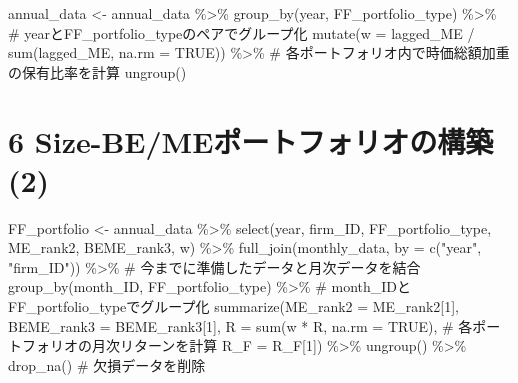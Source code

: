 \documentclass[
  letterpaper,
  DIV=11,
  numbers=noendperiod]{scrreprt}
\newenvironment{Shaded}{\begin{snugshade}}{\end{snugshade}}
\newcommand{\AttributeTok}[1]{\textcolor[rgb]{0.40,0.45,0.13}{#1}}
\newcommand{\CommentTok}[1]{\textcolor[rgb]{0.37,0.37,0.37}{#1}}
\newcommand{\ConstantTok}[1]{\textcolor[rgb]{0.56,0.35,0.01}{#1}}
\newcommand{\DecValTok}[1]{\textcolor[rgb]{0.68,0.00,0.00}{#1}}
\newcommand{\FunctionTok}[1]{\textcolor[rgb]{0.28,0.35,0.67}{#1}}
\newcommand{\NormalTok}[1]{\textcolor[rgb]{0.00,0.23,0.31}{#1}}
\newcommand{\OtherTok}[1]{\textcolor[rgb]{0.00,0.23,0.31}{#1}}
\newcommand{\SpecialCharTok}[1]{\textcolor[rgb]{0.37,0.37,0.37}{#1}}
\newcommand{\StringTok}[1]{\textcolor[rgb]{0.13,0.47,0.30}{#1}}
\begin{document}
\begin{Shaded}
\begin{Highlighting}[]
\NormalTok{annual\_data }\OtherTok{\textless{}{-}}\NormalTok{ annual\_data }\SpecialCharTok{\%\textgreater{}\%}
  \FunctionTok{group\_by}\NormalTok{(year, FF\_portfolio\_type) }\SpecialCharTok{\%\textgreater{}\%} \CommentTok{\# yearとFF\_portfolio\_typeのペアでグループ化}
  \FunctionTok{mutate}\NormalTok{(}\AttributeTok{w =}\NormalTok{ lagged\_ME  }\SpecialCharTok{/} \FunctionTok{sum}\NormalTok{(lagged\_ME, }\AttributeTok{na.rm =} \ConstantTok{TRUE}\NormalTok{)) }\SpecialCharTok{\%\textgreater{}\%} \CommentTok{\# 各ポートフォリオ内で時価総額加重の保有比率を計算}
  \FunctionTok{ungroup}\NormalTok{()}
\end{Highlighting}
\end{Shaded}

\section{6 Size-BE/MEポートフォリオの構築
(2)}\label{size-bemeux30ddux30fcux30c8ux30d5ux30a9ux30eaux30aaux306eux69cbux7bc9-2}

\begin{Shaded}
\begin{Highlighting}[]
\NormalTok{FF\_portfolio }\OtherTok{\textless{}{-}}\NormalTok{ annual\_data }\SpecialCharTok{\%\textgreater{}\%}
  \FunctionTok{select}\NormalTok{(year, firm\_ID, FF\_portfolio\_type, ME\_rank2, BEME\_rank3, w) }\SpecialCharTok{\%\textgreater{}\%}
  \FunctionTok{full\_join}\NormalTok{(monthly\_data, }\AttributeTok{by =} \FunctionTok{c}\NormalTok{(}\StringTok{"year"}\NormalTok{, }\StringTok{"firm\_ID"}\NormalTok{)) }\SpecialCharTok{\%\textgreater{}\%} \CommentTok{\# 今までに準備したデータと月次データを結合}
  \FunctionTok{group\_by}\NormalTok{(month\_ID, FF\_portfolio\_type) }\SpecialCharTok{\%\textgreater{}\%} \CommentTok{\# month\_IDとFF\_portfolio\_typeでグループ化}
  \FunctionTok{summarize}\NormalTok{(}\AttributeTok{ME\_rank2 =}\NormalTok{ ME\_rank2[}\DecValTok{1}\NormalTok{],}
            \AttributeTok{BEME\_rank3 =}\NormalTok{ BEME\_rank3[}\DecValTok{1}\NormalTok{],}
            \AttributeTok{R =} \FunctionTok{sum}\NormalTok{(w }\SpecialCharTok{*}\NormalTok{ R, }\AttributeTok{na.rm =} \ConstantTok{TRUE}\NormalTok{), }\CommentTok{\# 各ポートフォリオの月次リターンを計算}
            \AttributeTok{R\_F =}\NormalTok{ R\_F[}\DecValTok{1}\NormalTok{]) }\SpecialCharTok{\%\textgreater{}\%}
  \FunctionTok{ungroup}\NormalTok{() }\SpecialCharTok{\%\textgreater{}\%}
  \FunctionTok{drop\_na}\NormalTok{() }\CommentTok{\# 欠損データを削除}
\end{Highlighting}
\end{Shaded}
\end{document}
